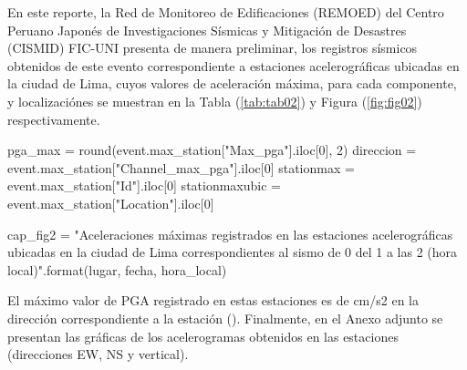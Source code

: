 \documentclass[11pt, a4paper]{report}
\begin{document}
\vspace{1cm}

\noindent
En este reporte, la Red de Monitoreo de Edificaciones (REMOED) del Centro Peruano Japonés de Investigaciones Sísmicas y Mitigación
de Desastres (CISMID) FIC-UNI presenta de manera preliminar, los registros sísmicos obtenidos de este evento correspondiente a 
 estaciones acelerográficas ubicadas en la ciudad de Lima, cuyos valores de aceleración máxima, para cada 
componente, y localizaciónes se muestran en la Tabla (\ref{tab:tab02}) y Figura (\ref{fig:fig02}) respectivamente.\\

\begin{pycode}
pga_max = round(event.max_station["Max_pga"].iloc[0], 2)
direccion = event.max_station["Channel_max_pga"].iloc[0]
stationmax = event.max_station["Id"].iloc[0]
stationmaxubic = event.max_station["Location"].iloc[0]

cap_fig2 = "Aceleraciones máximas registrados en las estaciones acelerográficas ubicadas en la ciudad de Lima correspondientes al sismo de {0} del {1} a las {2} (hora local)".format(lugar, fecha, hora_local)

\end{pycode}

\newpage
\noindent
El máximo valor de PGA registrado en estas estaciones es de  cm/s2 en la dirección  
correspondiente a la estación  ().
Finalmente, en el Anexo adjunto se presentan las gráficas de los acelerogramas obtenidos 
en las  estaciones (direcciones EW, NS y vertical).
\end{document}
